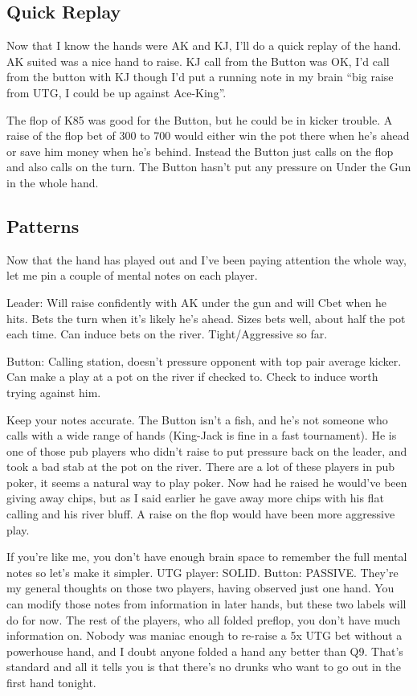 \subsection*{Quick Replay}

Now that I know the hands were AK and KJ, I'll do a quick replay
of the hand. AK suited was a nice hand to raise. KJ call from the
Button was OK, I'd call from the button with KJ though I'd put
a running note in my brain ``big raise from UTG, I could be up
against Ace-King''.

The flop of K85 was good for the Button, but he could be in kicker
trouble. A raise of the flop bet of 300 to 700 would either win the
pot there when he's ahead or save him money when he's behind. Instead
the Button just calls on the flop and also calls on the turn. The
Button hasn't put any pressure on Under the Gun in the whole hand.

\subsection*{Patterns}

Now that the hand has played out and I've been paying attention the whole
way, let me pin a couple of mental notes on each player.

Leader: Will raise confidently with AK under the gun and will Cbet when
he hits. Bets the turn when it's likely he's ahead. Sizes bets well, about
half the pot each time. Can induce bets on the river. Tight/Aggressive so far.

Button: Calling station, doesn't pressure opponent with top pair
average kicker. Can make a play at a pot on the river if checked to.
Check to induce worth trying against him.

Keep your notes accurate. The Button isn't a fish,
and he's not someone who calls with a wide range of hands (King-Jack
is fine in a fast tournament). He is one of those
pub players who didn't raise to put pressure back on the leader, and
took a bad stab at the pot on the river. There are a lot of these
players in pub poker, it seems a natural way to play poker. Now had he
raised he would've been giving away chips, but as I said earlier he
gave away more chips with his flat calling and his river bluff. A
raise on the flop would have been more aggressive play.

If you're like me, you don't have enough brain space to remember the
full mental notes so let's make it simpler. UTG player: SOLID.
Button: PASSIVE. They're my general thoughts on those two players,
having observed just one hand. You can modify those notes from
information in later hands, but these two labels will do for now. The
rest of the players, who all folded preflop, you don't have much
information on. Nobody was maniac enough to re-raise a 5x UTG bet
without a powerhouse hand, and I doubt anyone folded a hand any better
than Q9. That's standard and all it tells you is that there's no
drunks who want to go out in the first hand tonight.

